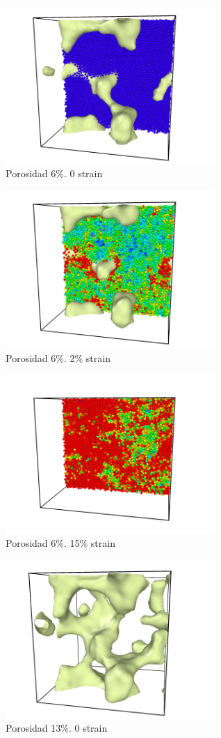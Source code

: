 \documentclass[10pt, oneside]{article} %
\begin{document}
\begin{figure}[H]
\centering
\includegraphics[width=8cm]{Figures/9_0strain_color.png}
\caption{Porosidad 6\%. 0 strain}
\end{figure}

\begin{figure}[H]
\centering
\includegraphics[width=8cm]{Figures/9_2strain_color.png}
\caption{Porosidad 6\%. 2\% strain}
\end{figure}

\begin{figure}[H]
\centering
\includegraphics[width=8cm]{Figures/9_15strain_color.png}
\caption{Porosidad 6\%. 15\% strain}
\end{figure}

\begin{figure}[H]
\centering
\includegraphics[width=8cm]{Figures/18_0strain.png}
\caption{Porosidad 13\%. 0 strain}
\end{figure}
\end{document}
